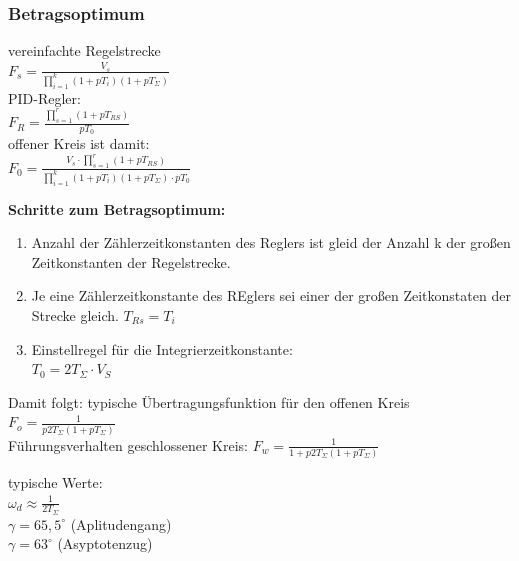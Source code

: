 \subsubsection{Betragsoptimum}
\begin{minipage}{0.45\textwidth}

vereinfachte Regelstrecke\\
$F_s = \frac{V_s}{\prod_{i=1}^k (1+pT_i)(1+pT_{\Sigma})}$\\
PID-Regler:\\
$F_R=\frac{\prod_{s=1}^r(1+pT_{RS})}{pT_0}$\\
offener Kreis ist damit:\\
$ F_0 = \frac{V_s \cdot \prod_{s=1}^r(1+pT_{RS})}{\prod_{i=1}^k (1+pT_i)(1+pT_{\Sigma})\cdot pT_0  }$
\end{minipage}
\begin{minipage}{0.45\textwidth}

\end{minipage}


\textbf{Schritte zum Betragsoptimum:} \\
\begin{enumerate}
  \item Anzahl der Zählerzeitkonstanten des Reglers ist gleid der Anzahl k der großen Zeitkonstanten der Regelstrecke.
  \item Je eine Zählerzeitkonstante des REglers sei einer der großen Zeitkonstaten der Strecke gleich. $T_{Rs} = T_i $
  \item Einstellregel für die Integrierzeitkonstante:\\
  $T_0 = 2T_{\Sigma} \cdot V_S$
\end{enumerate}


Damit folgt: typische Übertragungsfunktion für den offenen Kreis
$F_o = \frac{1}{p2T_{\Sigma}(1+pT_{\Sigma})}$\\
Führungsverhalten geschlossener Kreis:
$F_w = \frac{1}{1+p2T_{\Sigma}(1+pT_{\Sigma})}$

typische Werte:\\
$\omega_d \approx \frac{1}{2T_{\Sigma}}$\\
$\gamma = 65,5 ^{\circ}$ (Aplitudengang)\\
$\gamma = 63 ^{\circ}$ (Asyptotenzug)\\

